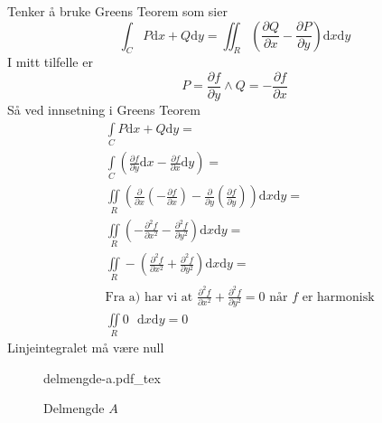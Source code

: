\documentclass[a4paper,10pt,english]{article}
\newcommand{\dd}[1]{\mathrm{d}#1}
\newcommand{\incfig}[2][1]{%
		\def\svgwidth{#1\columnwidth}
		{#2.pdf_tex}
	}
\begin{document}
\begin{enumerate}[a)]
			\newline
			Tenker å bruke Greens Teorem som sier \[
				\int_C P \dd{x} + Q \dd{y} = \iint_R \left (\frac{\partial Q}{\partial x} - \frac{\partial P}{\partial y} \right ) \dd{x}\dd{y} 
			\] 
			I mitt tilfelle er \[
			P = \frac{\partial f}{\partial y} \wedge Q = -\frac{\partial f}{\partial x} 
			\] 
			Så ved innsetning i Greens Teorem
			\begin{align*}
				& \int\limits_C P \dd{x} + Q \dd{y} = \\
				& \int\limits_C \left (\frac{\partial f}{\partial y} \dd{x} - \frac{\partial f}{\partial x} \dd{y} \right) = \\
				& \iint\limits_R \left( \frac{\partial }{\partial x} \left( - \frac{\partial f}{\partial x} \right) - \frac{\partial }{\partial y} \left( \frac{\partial f}{\partial y}  \right) \right) \dd{x}\dd{y} =\\ 
				& \iint\limits_R \left( - \frac{\partial^2 f}{\partial x^2} - \frac{\partial^2 f}{\partial y^2} \right) \dd{x}\dd{y} = \\
				& \iint\limits_R - \left( \frac{\partial^2 f}{\partial x^2} + \frac{\partial^2 f}{\partial y^2} \right) \dd{x}\dd{y} = \\
				& \text{Fra a) har vi at } \frac{\partial^2 f}{\partial x^2} + \frac{\partial^2 f}{\partial y^2} = 0 \text{ når $f$ er harmonisk}\\
				& \iint\limits_R 0 \text{ } \dd{x}\dd{y} = 0
			\end{align*}
			Linjeintegralet må være null
	\end{enumerate}
	\newpage

			\begin{figure}[h!]
			    \centering
			    \label{fig:delmengde-a}
			    \incfig{delmengde-a}
			    \caption{Delmengde $A$}
			\end{figure}\\
\end{document}
